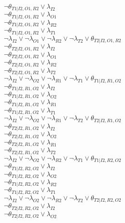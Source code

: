 $\neg\theta_{T1|I2,O1,R2} \vee \lambda_{I2}$\\
$\neg\theta_{T1|I2,O1,R2} \vee \lambda_{O1}$\\
$\neg\theta_{T1|I2,O1,R2} \vee \lambda_{R2}$\\
$\neg\theta_{T1|I2,O1,R2} \vee \lambda_{T1}$\\
$\neg\lambda_{I2} \vee \neg\lambda_{O1} \vee \neg\lambda_{R2} \vee \neg\lambda_{T2} \vee \theta_{T2|I2,O1,R2}$\\
$\neg\theta_{T2|I2,O1,R2} \vee \lambda_{I2}$\\
$\neg\theta_{T2|I2,O1,R2} \vee \lambda_{O1}$\\
$\neg\theta_{T2|I2,O1,R2} \vee \lambda_{R2}$\\
$\neg\theta_{T2|I2,O1,R2} \vee \lambda_{T2}$\\
$\neg\lambda_{I2} \vee \neg\lambda_{O2} \vee \neg\lambda_{R1} \vee \neg\lambda_{T1} \vee \theta_{T1|I2,R1,O2}$\\
$\neg\theta_{T1|I2,R1,O2} \vee \lambda_{I2}$\\
$\neg\theta_{T1|I2,R1,O2} \vee \lambda_{O2}$\\
$\neg\theta_{T1|I2,R1,O2} \vee \lambda_{R1}$\\
$\neg\theta_{T1|I2,R1,O2} \vee \lambda_{T1}$\\
$\neg\lambda_{I2} \vee \neg\lambda_{O2} \vee \neg\lambda_{R1} \vee \neg\lambda_{T2} \vee \theta_{T2|I2,R1,O2}$\\
$\neg\theta_{T2|I2,R1,O2} \vee \lambda_{I2}$\\
$\neg\theta_{T2|I2,R1,O2} \vee \lambda_{O2}$\\
$\neg\theta_{T2|I2,R1,O2} \vee \lambda_{R1}$\\
$\neg\theta_{T2|I2,R1,O2} \vee \lambda_{T2}$\\
$\neg\lambda_{I2} \vee \neg\lambda_{O2} \vee \neg\lambda_{R2} \vee \neg\lambda_{T1} \vee \theta_{T1|I2,R2,O2}$\\
$\neg\theta_{T1|I2,R2,O2} \vee \lambda_{I2}$\\
$\neg\theta_{T1|I2,R2,O2} \vee \lambda_{O2}$\\
$\neg\theta_{T1|I2,R2,O2} \vee \lambda_{R2}$\\
$\neg\theta_{T1|I2,R2,O2} \vee \lambda_{T1}$\\
$\neg\lambda_{I2} \vee \neg\lambda_{O2} \vee \neg\lambda_{R2} \vee \neg\lambda_{T2} \vee \theta_{T2|I2,R2,O2}$\\
$\neg\theta_{T2|I2,R2,O2} \vee \lambda_{I2}$\\
$\neg\theta_{T2|I2,R2,O2} \vee \lambda_{O2}$\\
